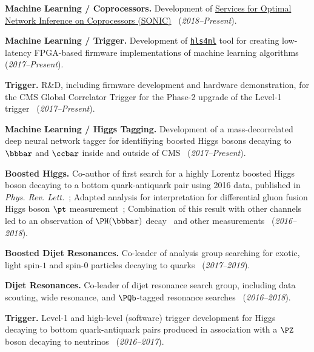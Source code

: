 \documentclass{res}
\begin{document}
\begin{resume}
  \textbf{Machine Learning / Coprocessors.} Development of \href{https://github.com/fastmachinelearning/SonicCMS}{Services for Optimal Network Inference on Coprocessors (SONIC)}~\cite{Krupa:2020bwg,Rankin:2020usv,neurips2019_sonic,Duarte:2019fta} (\textit{2018--Present}).

  \textbf{Machine Learning / Trigger.} Development of \href{https://fastmachinelearning.org/hls4ml/}{\texttt{hls4ml}} tool for creating low-latency FPGA-based firmware implementations of machine learning algorithms~\cite{Elabd:2021lgo,Deiana:2021niw,Govorkova:2021utb,Iiyama:2020wap,Heintz:2020soy,DiGuglielmo:2020eqx,Summers:2020xiy,neurips2019_hls4ml,Duarte:2018ite} (\textit{2017--Present}).

  \textbf{Trigger.} R\&D, including firmware development and hardware demonstration, for the CMS Global Correlator Trigger for the Phase-2 upgrade of the Level-1 trigger~\cite{CERN-LHCC-2020-004} (\emph{2017--Present}).

  \textbf{Machine Learning / Higgs Tagging.} Development of a mass-decorrelated deep neural network tagger for identifiying boosted Higgs bosons decaying to $\bbbar$ and $\ccbar$ inside and outside of  CMS~\cite{Moreno:2019neq,Moreno:2019bmu,neurips2019_hbb,CMS-DP-2018-046} (\textit{2017--Present}).

  \textbf{Boosted Higgs.} Co-author of first search for a highly Lorentz boosted Higgs boson decaying to a bottom quark-antiquark pair using 2016 data, published in \emph{Phys. Rev. Lett.}~\cite{Sirunyan:2017dgc}; Adapted analysis for interpretation for differential gluon fusion Higgs boson $\pt$ measurement~\cite{Sirunyan:2018sgc}; Combination of this result with other channels led to an observation of $\PH(\bbbar)$ decay~\cite{Sirunyan:2018kst} and other measurements~\cite{Sirunyan:2018koj} (\textit{2016--2018}).

  \textbf{Boosted Dijet Resonances.} Co-leader of analysis group searching for exotic, light spin-$1$ and spin-$0$ particles decaying to quarks~\cite{Sirunyan:2019vxa,Sirunyan:2019sgo,Sirunyan:2018ikr,Sirunyan:2017nvi} (\textit{2017--2019}).

  \textbf{Dijet Resonances.} Co-leader of dijet resonance search group, including data scouting, wide resonance, and $\PQb$-tagged resonance searches~\cite{Sirunyan:2019pnb,Sirunyan:2019vgj,CMS-PAS-EXO-17-026,Duarte:2018bsd,Sirunyan:2018xlo,Sirunyan:2016iap} (\textit{2016--2018}).

  \textbf{Trigger.} Level-1 and high-level (software) trigger development for Higgs decaying to bottom quark-antiquark pairs produced in association with a $\PZ$ boson decaying to neutrinos~\cite{Sirunyan:2018kst} (\textit{2016--2017}).


\end{resume}
\end{document}

